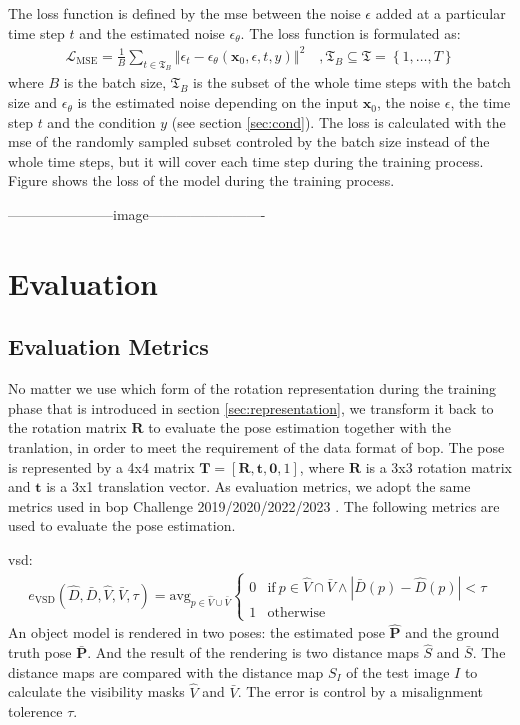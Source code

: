 \documentclass[12pt,DIV14,BCOR12mm,a4paper,footinclude=false,headinclude,parskip=half-,twoside,openright,cleardoublepage=empty,toc=index,bibliography=totoc,listof=totoc]{scrreprt}
\numberwithin{equation}{chapter}
\begin{document}
The loss function is defined by the \gls{mse} between the noise $\epsilon$ added at a particular time step $t$ and the estimated noise $\epsilon_{\theta}$. The loss function is formulated as:
\begin{align}
  \mathcal{L}_{\text{MSE}}=\frac{1}{B}\sum_{t\in \mathfrak{T}_{B} }\left\Vert \epsilon_{t}-\epsilon_{\theta}(\mathbf{x}_{0},\epsilon, t, y)\right\Vert^{2} \quad , \mathfrak{T}_{B}\subseteq \mathfrak{T}=\left\{1,\dots,T\right\}
\end{align}
where $B$ is the batch size, $\mathfrak{T}_{B}$ is the subset of the whole time steps with the batch size and $\epsilon_{\theta}$ is the estimated noise depending on the input $\mathbf{x}_{0}$, the noise $\epsilon$, the time step $t$ and the condition $y$ (see section \ref{sec:cond}). The loss is calculated with the \gls{mse} of the randomly sampled subset controled by the batch size instead of the whole time steps, but it will cover each time step during the training process. Figure shows the loss of the model during the training process.

-----------------------image-------------------------

\section{Evaluation}
\subsection{Evaluation Metrics}
No matter we use which form of the rotation representation during the training phase that is introduced in section \ref{sec:representation}, we transform it back to the rotation matrix $\mathbf{R}$ to evaluate the pose estimation together with the tranlation, in order to meet the requirement of the data format of \gls{bop}. The pose is represented by a 4x4 matrix $\mathbf{T}=[\mathbf{R},\mathbf{t},\mathbf{0},1]$, where $\mathbf{R}$ is a 3x3 rotation matrix and $\mathbf{t}$ is a 3x1 translation vector. As evaluation metrics, we adopt the same metrics used in \gls{bop} Challenge 2019/2020/2022/2023 \cite{hodan2018bop,hodan2020bop}. The following metrics are used to evaluate the pose estimation. 

\gls{vsd}: 
\begin{align}
 e_{\text{VSD}}\left(\hat{D},\bar{D},\hat{V},\bar{V},\tau\right)=\text{avg}_{p\in \hat{V}\cup \bar{V}}
  \begin{cases}
    0 & \text{if} \ p\in \hat{V}\cap  \bar{V} \land \left|\bar{D}(p)-\hat{D}(p)\right|<\tau\\
    1 & \text{otherwise}
  \end{cases}
\end{align}
An object model is rendered in two poses: the estimated pose $\mathbf{\hat{P}}$ and the ground truth pose $\mathbf{\bar{P}}$. And the result of the rendering is two distance maps $\hat{S}$ and $\bar{S}$. The distance maps are compared with the distance map $S_I$ of the test image $I$ to calculate the visibility masks $\hat{V}$ and $\bar{V}$. The error is control by a misalignment tolerence $\tau$.
\end{document}
